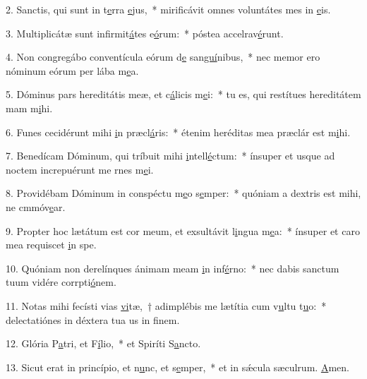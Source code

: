 2. Sanctis, qui sunt in t\uline{e}rra \uline{e}jus,~* mirificávit omnes voluntátes mes in \uline{e}is.\par 
3. Multiplicátæ sunt infirmit\uline{á}tes e\uline{ó}rum:~* póstea accelrav\uline{é}runt.\par 
4. Non congregábo conventícula eórum d\uline{e} san\uline{guí}nibus,~* nec memor ero nóminum eórum per lába m\uline{e}a.\par 
5. Dóminus pars hereditátis meæ, et c\uline{á}licis m\uline{e}i:~* tu es, qui restítues hereditátem mam m\uline{i}hi.\par 
6. Funes cecidérunt mihi \uline{i}n præcl\uline{á}ris:~* étenim heréditas mea præclár est m\uline{i}hi.\par 
7. Benedícam Dóminum, qui tríbuit mihi \uline{i}ntell\uline{é}ctum:~* ínsuper et usque ad noctem increpuérunt me rnes m\uline{e}i.\par 
8. Providébam Dóminum in conspéctu m\uline{e}o s\uline{e}mper:~* quóniam a dextris est mihi, ne cmmóv\uline{e}ar.\par 
9. Propter hoc lætátum est cor meum, et exsultávit l\uline{i}ngua m\uline{e}a:~* ínsuper et caro mea requiscet \uline{i}n spe.\par 
10. Quóniam non derelínques ánimam meam \uline{i}n inf\uline{é}rno:~* nec dabis sanctum tuum vidére corrpti\uline{ó}nem.\par 
11. Notas mihi fecísti vias \uline{vi}tæ,~† adimplébis me lætítia cum v\uline{u}ltu t\uline{u}o:~* delectatiónes in déxtera tua us in f\uline{i}nem.\par 
12. Glória P\uline{a}tri, et F\uline{í}lio,~* et Spiríti S\uline{a}ncto.\par 
13. Sicut erat in princípio, et n\uline{u}nc, et s\uline{e}mper,~* et in sǽcula sæculrum. \uline{A}men.\par 
